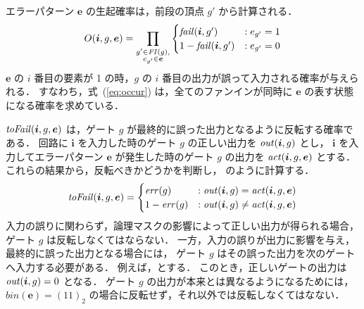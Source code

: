 エラーパターン ${\bm e}$ の生起確率は，前段の頂点 $g'$ から計算される．
\begin{eqnarray}
  O({\bm i}, g, {\bm e}) = \prod_{\substack{g' \in {\it FI}(g),\\ e_{g'} \in {\bm e}}} \begin{cases}
    {\it fail}({\bm i}, g') & : e_{g'} = 1\\
    1 - {\it fail}({\bm i}, g') & : e_{g'} = 0
  \end{cases} \label{eq:occur}
\end{eqnarray}
${\bm e}$ の $i$ 番目の要素が 1 の時，$g$ の $i$ 番目の出力が誤って入力される確率が与えられる．
すなわち，式~(\ref{eq:occur}) は，全てのファンインが同時に ${\bm e}$ の表す状態になる確率を求めている．

${\it toFail}({\bm i}, g, {\bm e})$ は，ゲート $g$ が最終的に誤った出力となるように反転する確率である．
回路に ${\bm i}$ を入力した時のゲート $g$ の正しい出力を ${\it out}({\bm i}, g)$ とし，
${\bm i}$ を入力してエラーパターン ${\bm e}$ が発生した時のゲート $g$ の出力を
${\it act}({\bm i}, g, {\bm e})$ とする．
これらの結果から，反転べきかどうかを判断し， のように計算する．
\begin{eqnarray}
  {\it toFail}({\bm i}, g, {\bm e}) = \begin{cases}
    {\it err}(g) & : {\it out}({\bm i}, g) = {\it act}({\bm i}, g, {\bm e})\\
    1 - {\it err}(g) & : {\it out}({\bm i}, g) \neq {\it act}({\bm i}, g, {\bm e})
  \end{cases} \label{eq:to_fail}
\end{eqnarray}
入力の誤りに関わらず，論理マスクの影響によって正しい出力が得られる場合，
ゲート $g$ は反転しなくてはならない．
一方，入力の誤りが出力に影響を与え，最終的に誤った出力となる場合には，
ゲート $g$ はその誤った出力を次のゲートへ入力する必要がある．
例えば，とする．
このとき，正しいゲートの出力は ${\it out}({\bm i}, g) = 0$ となる．
ゲート $g$ の出力が本来とは異なるようになるためには，
$bin({\bm e}) = (11)_2$ の場合に反転せず，それ以外では反転しなくてはなない．

